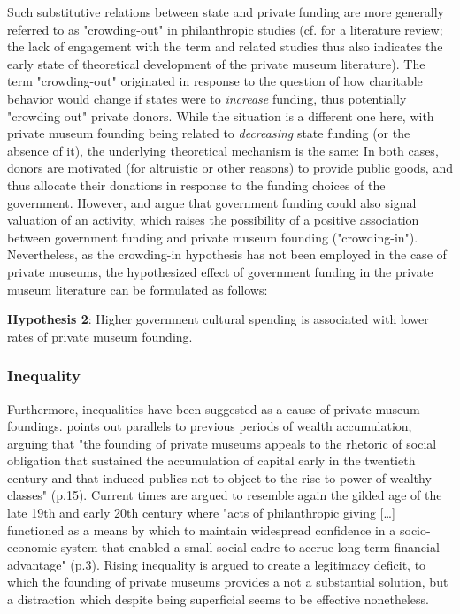 \documentclass[11pt, authoryear]{elsarticle}
\begin{document}
Such substitutive relations between state and private funding are more generally referred to as "crowding-out" in philanthropic studies (cf. \citealt{Bekkers_Wiepking_2010_literature} for a literature review;  the lack of engagement with the term and related studies thus also indicates the early state of theoretical development of the private museum literature).
The term "crowding-out" originated in response to the question of how charitable behavior would change if states were to \emph{increase} funding, thus potentially "crowding out" private donors.
While the situation is a different one here, with private museum founding being related to \emph{decreasing} state funding (or the absence of it), the underlying theoretical mechanism is the same:
In both cases, donors are motivated (for altruistic or other reasons) to provide public goods, and thus allocate their donations in response to the funding choices of the government.
However, \citet{DeWit_etal_2018_philanthropy} and \citet{Lena_2019_entitled} argue that government funding could also signal valuation of an activity, which raises the possibility of a positive association between government funding and private museum founding ("crowding-in").
Nevertheless, as the crowding-in hypothesis has not been employed in the case of private museums, the hypothesized effect of government funding in the private museum literature can be formulated as follows:  

\bigbreak
\noindent
\textbf{Hypothesis 2}: Higher government cultural spending is associated with lower rates of private museum founding.


\subsubsection*{Inequality}


Furthermore, inequalities have been suggested as a cause of private museum foundings. 
\citet{Brown_2019_private} points out parallels to previous periods of wealth accumulation, arguing that "the founding of private museums appeals to the rhetoric of social obligation that sustained the accumulation of capital early in the twentieth century and that induced publics not to object to the rise to power of wealthy classes" (p.15).
Current times are argued to resemble again the gilded age of the late 19th and early 20th century where "acts of philanthropic giving [\ldots{}] functioned as a means by which to maintain widespread confidence in a socio-economic system that enabled a small social cadre to accrue long-term financial advantage" (p.3). 
Rising inequality is argued to create a legitimacy deficit, to which the founding of private museums provides a not a substantial solution, but a distraction which despite being superficial seems to be effective nonetheless.
\end{document}
